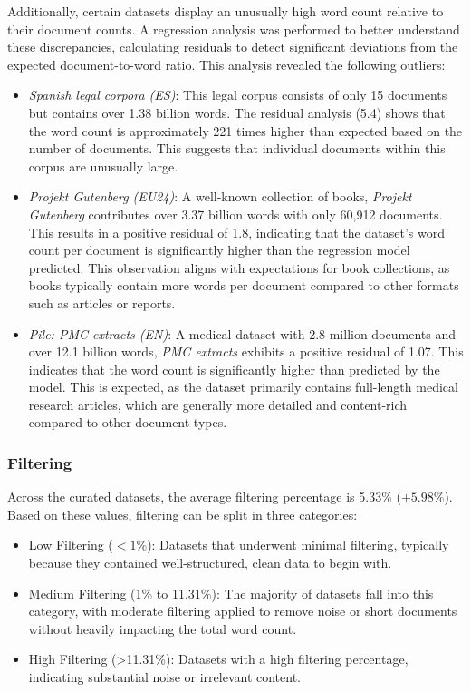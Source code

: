 Additionally, certain datasets display an unusually high word count relative to their document counts. A regression analysis was performed to better understand these discrepancies, calculating residuals to detect significant deviations from the expected document-to-word ratio. This analysis revealed the following outliers:

\begin{itemize} 
\item \textit{Spanish legal corpora (ES)}: This legal corpus consists of only 15 documents but contains over 1.38 billion words. The residual analysis (5.4) shows that the word count is approximately 221 times higher than expected based on the number of documents. This suggests that individual documents within this corpus are unusually large.

\item \textit{Projekt Gutenberg (EU24)}: A well-known collection of books, \textit{Projekt Gutenberg} contributes over 3.37 billion words with only 60,912 documents. This results in a positive residual of 1.8, indicating that the dataset's word count per document is significantly higher than the regression model predicted. This observation aligns with expectations for book collections, as books typically contain more words per document compared to other formats such as articles or reports.

\item \textit{Pile: PMC extracts (EN)}: A medical dataset with 2.8 million documents and over 12.1 billion words, \textit{PMC extracts} exhibits a positive residual of 1.07. This indicates that the word count is significantly higher than predicted by the model. This is expected, as the dataset primarily contains full-length medical research articles, which are generally more detailed and content-rich compared to other document types.

\end{itemize}


\subsubsection{Filtering}

Across the curated datasets, the average filtering percentage is 5.33\% ($\pm 5.98\%$). Based on these values, filtering can be  split in three categories:

\begin{itemize}
    \item Low Filtering ($<1\%$): Datasets that underwent minimal filtering, typically because they contained well-structured, clean data to begin with. 
    
    \item  Medium Filtering (1\% to 11.31\%): The majority of datasets fall into this category, with moderate filtering applied to remove noise or short documents without heavily impacting the total word count. 
    
    \item  High Filtering (>11.31\%): Datasets with a high filtering percentage, indicating substantial noise or irrelevant content. 
\end{itemize}

